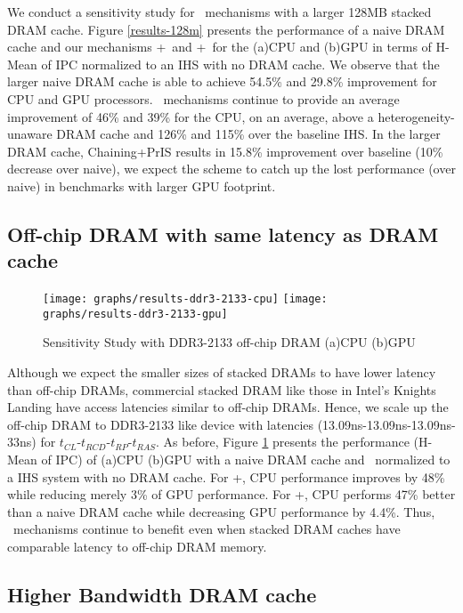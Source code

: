 We conduct a sensitivity study for \cachename\ mechanisms with a larger 128MB stacked DRAM cache. Figure \ref{results-128m} presents the performance of a naive DRAM cache and our mechanisms \bypassname+\prioname\ and \chaining+\prioname\ for the (a)CPU and (b)GPU in terms of H-Mean of IPC normalized to an IHS with no DRAM cache. We observe that the larger naive DRAM cache is able to achieve 54.5\% and 29.8\% improvement for CPU and GPU processors. \cachename\ mechanisms continue to provide an average improvement of 46\% and 39\% for the CPU, on an average, above a heterogeneity-unaware DRAM cache and 126\% and 115\% over the baseline IHS. 
In the larger DRAM cache, Chaining+PrIS results in 15.8\% improvement over baseline (10\% decrease over naive), we
expect the scheme to catch up the lost performance (over naive) in benchmarks with larger GPU footprint.


\subsection{Off-chip DRAM with same latency as DRAM cache}

\begin{figure}[!htb]
	\centering
	\texttt{[image: graphs/results-ddr3-2133-cpu]}
	\texttt{[image: graphs/results-ddr3-2133-gpu]}
	\caption{Sensitivity Study with DDR3-2133 off-chip DRAM (a)CPU (b)GPU}
	\label{results-2xbw}
\end{figure}

Although we expect the smaller sizes of stacked DRAMs to have lower latency than off-chip DRAMs, commercial stacked DRAM like those in Intel's Knights Landing \cite{xeonphi} have access latencies similar to off-chip DRAMs. Hence, we scale up the off-chip DRAM to DDR3-2133 like device with latencies (13.09ns-13.09ns-13.09ns-33ns) for $t_{CL}$-$t_{RCD}$-$t_{RP}$-$t_{RAS}$. As before, Figure \ref{results-2xbw} presents the performance (H-Mean of IPC) of (a)CPU (b)GPU with a naive DRAM cache and \cachename\ normalized to a IHS system with no DRAM cache. For \prioname+\bypassname, CPU performance improves by 48\% while reducing merely 3\% of GPU performance. For \prioname+\chaining, CPU performs 47\% better than a naive DRAM cache while decreasing GPU performance by 4.4\%. Thus, \cachename\ mechanisms continue to benefit even when stacked DRAM caches have comparable latency to off-chip DRAM memory.

\subsection{Higher Bandwidth DRAM cache}

